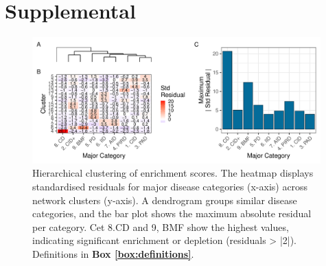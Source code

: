 \newpage



\clearpage
\beginsupplement
\section{Supplemental} \label{Supplemental_text}

\begin{figure}[ht]
  \centering
  \includegraphics[width=0.99\textwidth]{../images/untangleR_ppi_network_patch2_cator.pdf}
  \caption{
    Hierarchical clustering of enrichment scores.
    The heatmap displays standardised residuals for major disease categories (x-axis) across network clusters (y-axis). A dendrogram groups similar disease categories, and the bar plot shows the maximum absolute residual per category. Cet 8.CD and 9, BMF show the highest values, indicating significant enrichment or depletion (residuals > |2|). Definitions in \textbf{Box \ref{box:definitions}}.
  }
  \label{fig:patch2}
\end{figure}

